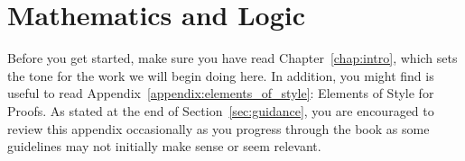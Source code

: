 \chapter{Mathematics and Logic}\label{chap:IntroToMath}


Before you get started, make sure you have read Chapter~\ref{chap:intro}, which sets the tone for the work we will begin doing here. In addition, you might find is useful to read Appendix~\ref{appendix:elements_of_style}: Elements of Style for Proofs. As stated at the end of Section~\ref{sec:guidance}, you are encouraged to review this appendix occasionally as you progress through the book as some guidelines may not initially make sense or seem relevant.